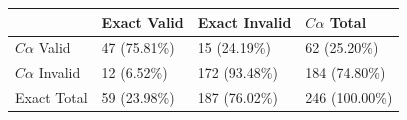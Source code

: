 \begin{tabular}{llll}
\toprule
 & Exact Valid & Exact Invalid & $C\alpha$ Total \\
\midrule
$C\alpha$ Valid & 47 (75.81\%) & 15 (24.19\%) & 62 (25.20\%) \\
$C\alpha$ Invalid & 12 (6.52\%) & 172 (93.48\%) & 184 (74.80\%) \\
Exact Total & 59 (23.98\%) & 187 (76.02\%) & 246 (100.00\%) \\
\bottomrule
\end{tabular}
